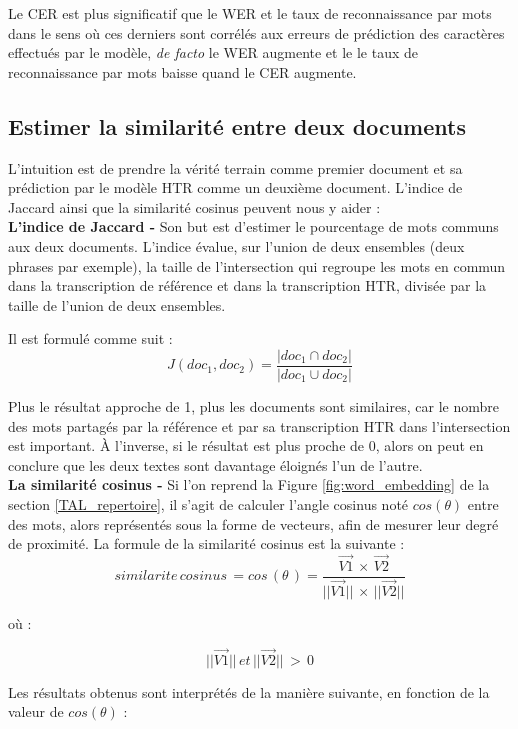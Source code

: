 Le CER est plus significatif que le WER et le taux de reconnaissance par mots dans le sens où ces derniers sont corrélés aux erreurs de prédiction des caractères effectués par le modèle, \textit{de facto} le WER augmente et le le taux de reconnaissance par mots baisse quand le CER augmente.

\subsection{Estimer la similarité entre deux documents}

L'intuition est de prendre la vérité terrain comme premier document et sa prédiction par le modèle HTR comme un deuxième document. L'indice de Jaccard ainsi que la similarité cosinus peuvent nous y aider :\\

\textbf{L'indice de Jaccard -} Son but est d'estimer le pourcentage de mots communs aux deux documents. L'indice évalue, sur l'union de deux ensembles (deux phrases par exemple), la taille de l'intersection qui regroupe les mots en commun dans la transcription de référence et dans la transcription HTR, divisée par la taille de l'union de deux ensembles.

Il est formulé comme suit : $$ J(doc_1,doc_2) = \frac{|doc_1 \cap doc_2|}{|doc_1 \cup doc_2|} $$

Plus le résultat approche de 1, plus les documents sont similaires, car le nombre des mots partagés par la référence et par sa transcription HTR dans l'intersection est important. À l'inverse, si le résultat est plus proche de 0, alors on peut en conclure que les deux textes sont davantage éloignés l'un de l'autre.\\

\textbf{La similarité cosinus -} Si l'on reprend la Figure \ref{fig:word_embedding} de la section \ref{TAL_repertoire}, il s'agit de calculer l'angle cosinus noté $cos(\theta)$ entre des mots, alors représentés sous la forme de vecteurs, afin de mesurer leur degré de proximité. La formule de la similarité cosinus est la suivante : $$ similarite\, cosinus \, = cos\, (\theta\,) = \frac{\overrightarrow{V1}\, \times \,\overrightarrow{V2}}{||\overrightarrow{V1}||\, \times \,||\overrightarrow{V2}||} $$

où : 

$$ ||\overrightarrow{V1}||\, et\, ||\overrightarrow{V2}||\, >\, 0 $$

Les résultats obtenus sont interprétés de la manière suivante, en fonction de la valeur de $cos(\theta)$ :

